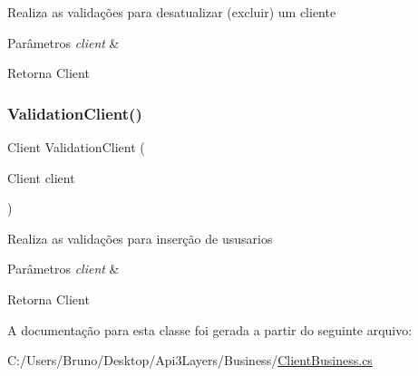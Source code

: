 Realiza as validações para desatualizar (excluir) um cliente 


\begin{DoxyParams}{Parâmetros}
{\em client} & \\
\hline
\end{DoxyParams}
\begin{DoxyReturn}{Retorna}
Client
\end{DoxyReturn}
\mbox{\label{classBusiness_1_1ClientBusiness_a8342831feddce88564ead2ac46ea1550}} 
\subsubsection{\texorpdfstring{Validation\+Client()}{ValidationClient()}}
{\footnotesize\ttfamily Client Validation\+Client (\begin{DoxyParamCaption}\item[{Client}]{client }\end{DoxyParamCaption})}



Realiza as validações para inserção de ususarios 


\begin{DoxyParams}{Parâmetros}
{\em client} & \\
\hline
\end{DoxyParams}
\begin{DoxyReturn}{Retorna}
Client
\end{DoxyReturn}


A documentação para esta classe foi gerada a partir do seguinte arquivo\+:\begin{DoxyCompactItemize}
\item 
C\+:/\+Users/\+Bruno/\+Desktop/\+Api3\+Layers/\+Business/\hyperlink{ClientBusiness_8cs}{Client\+Business.\+cs}\end{DoxyCompactItemize}
